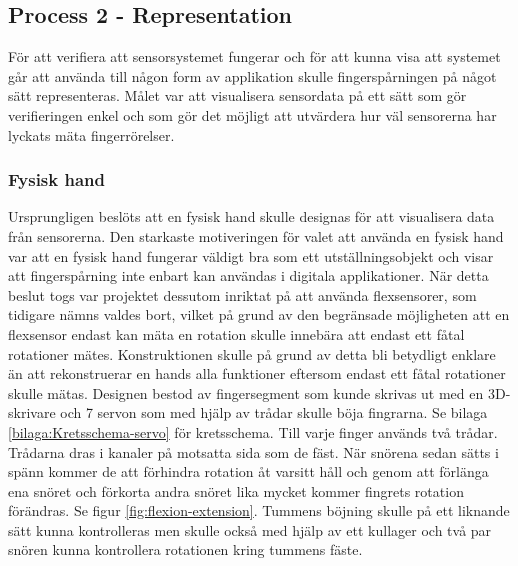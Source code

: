 \documentclass[a4paper]{article}
\makeatletter
\let\\\@raggedtwoe@savedcr%
\makeatother
\begin{document}
\begin{sloppypar}
    \subsection{Process 2 - Representation}

    För att verifiera att sensorsystemet fungerar och för att kunna visa att systemet går att använda till någon form av applikation skulle fingerspårningen på något sätt representeras.
    Målet var att visualisera sensordata på ett sätt som gör verifieringen enkel och som gör det möjligt att utvärdera hur väl sensorerna har lyckats mäta fingerrörelser.


    \subsubsection{Fysisk hand}
    Ursprungligen beslöts att en fysisk hand skulle designas för att visualisera data från sensorerna.
    Den starkaste motiveringen för valet att använda en fysisk hand var att en fysisk hand fungerar väldigt bra som ett utställningsobjekt
    och visar att fingerspårning inte enbart kan användas i digitala applikationer.
    När detta beslut togs var projektet dessutom inriktat på att använda flexsensorer, som tidigare nämns valdes bort,
    vilket på grund av den begränsade möjligheten att en flexsensor endast kan mäta en rotation skulle innebära att endast ett fåtal rotationer mätes.
    Konstruktionen skulle på grund av detta bli betydligt enklare än att rekonstruerar en hands alla funktioner eftersom
    endast ett fåtal rotationer skulle mätas.
    \\\\
    Designen bestod av fingersegment som kunde skrivas ut med en 3D-skrivare och 7 servon som med hjälp av trådar skulle böja fingrarna. Se bilaga \ref{bilaga:Kretsschema-servo} för kretsschema.
    Till varje finger används två trådar. Trådarna dras i kanaler på motsatta sida som de fäst.
    När snörena sedan sätts i spänn kommer de att förhindra rotation åt varsitt håll och genom att förlänga ena snöret och förkorta andra snöret lika mycket kommer fingrets rotation förändras. Se figur \ref{fig:flexion-extension}.
    Tummens böjning skulle på ett liknande sätt kunna kontrolleras men skulle också med hjälp av ett kullager och två par snören kunna kontrollera rotationen kring tummens fäste.



\end{sloppypar}
\end{document}
